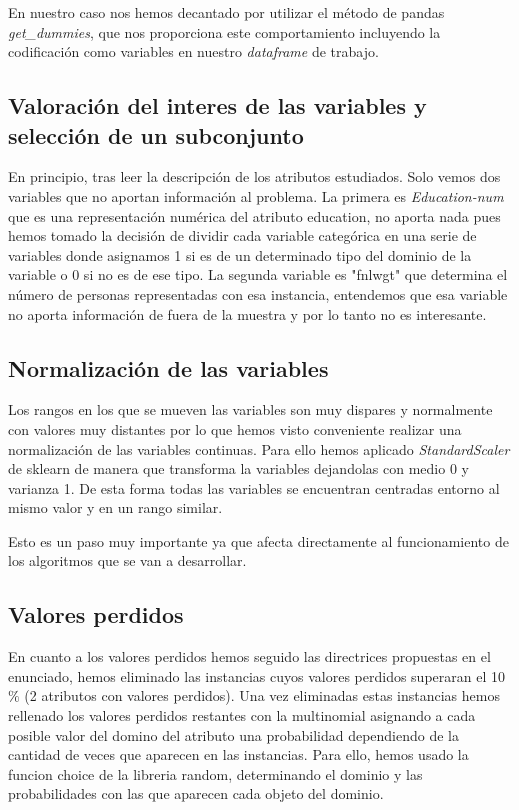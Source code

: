 \documentclass[a4paper,11pt]{article}
\begin{document}
En nuestro caso nos hemos decantado por utilizar el método de pandas
\textit{get\_dummies}, que nos proporciona este comportamiento incluyendo la
codificación como variables en nuestro \textit{dataframe} de trabajo.

\subsection{Valoración del interes de las variables y selección de un subconjunto}

En principio, tras leer la descripción de los atributos estudiados. Solo vemos
dos variables que no aportan información al problema. La primera es
\textit{Education-num} que es una representación numérica del atributo education, no
aporta nada pues hemos tomado la decisión de dividir cada variable categórica en
una serie de variables donde asignamos 1 si es de un determinado tipo del
dominio de la variable o 0 si no es de ese tipo. La segunda variable es "fnlwgt"
que determina el número de personas representadas con esa instancia, entendemos
que esa variable no aporta información de fuera de la muestra y por lo tanto no
es interesante.

\subsection{Normalización de las variables}

Los rangos en los que se mueven las variables son muy dispares y normalmente con
valores muy distantes por lo que hemos visto conveniente realizar una
normalización de las variables continuas. Para ello hemos aplicado
\textit{StandardScaler} de sklearn de manera que transforma la variables
dejandolas con medio 0 y varianza 1. De esta forma  todas las variables se
encuentran centradas entorno al mismo valor y en un rango similar. 

Esto es un paso muy importante ya que afecta directamente al funcionamiento 
de los algoritmos que se van a desarrollar.

\subsection{Valores perdidos}

En cuanto a los valores perdidos hemos seguido las directrices propuestas en el
enunciado, hemos eliminado las instancias cuyos valores perdidos superaran el
10$\%$ (2 atributos con valores perdidos). Una vez eliminadas estas instancias
hemos rellenado los valores perdidos restantes con la multinomial asignando a
cada posible valor del domino del atributo una probabilidad dependiendo de la
cantidad de veces que aparecen en las instancias. Para ello, hemos usado la
funcion choice de la libreria random, determinando el dominio y las
probabilidades con las que aparecen cada objeto del dominio.
\end{document}
